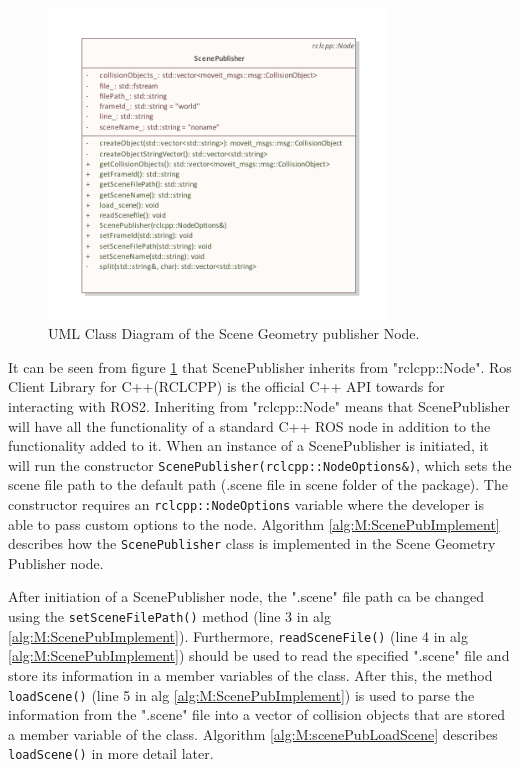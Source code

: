 \begin{figure}[htp]
  \centering
  \includegraphics[width = 0.8\textwidth]{Figures/scene_geometry_publisher.pdf}
  \caption{UML Class Diagram of the Scene Geometry publisher Node.}
  \label{fig:scenePublisherUML}
\end{figure}

It can be seen from figure \ref{fig:scenePublisherUML} that ScenePublisher inherits from "rclcpp::Node".  Ros Client Library for C++(RCLCPP) is the official C++ API towards for interacting with ROS2. Inheriting from  "rclcpp::Node" means that ScenePublisher will have all the functionality of a standard C++ ROS node in addition to the functionality added to it. When an instance of a ScenePublisher is initiated, it will run the constructor \lstinline{ScenePublisher(rclcpp::NodeOptions&)}, which sets the scene file path to the default path (.scene file in scene folder of the package). The constructor requires an \lstinline{rclcpp::NodeOptions} variable where the developer is able to pass custom options to the node. Algorithm \ref{alg:M:ScenePubImplement} describes how the \lstinline{ScenePublisher} class is implemented in the Scene Geometry Publisher node.



After initiation of a ScenePublisher node, the ".scene" file path ca be changed using the \lstinline{setSceneFilePath()} method (line 3 in alg \ref{alg:M:ScenePubImplement}). Furthermore, \lstinline{readSceneFile()} (line 4 in alg \ref{alg:M:ScenePubImplement}) should be used to read the specified ".scene" file and store its information in a member variables of the class. After this, the method \lstinline{loadScene()} (line 5 in alg \ref{alg:M:ScenePubImplement}) is used to parse the information from the ".scene" file into a vector of collision objects that are stored a member variable of the class. Algorithm \ref{alg:M:scenePubLoadScene} describes \lstinline{loadScene()} in more detail later. 

